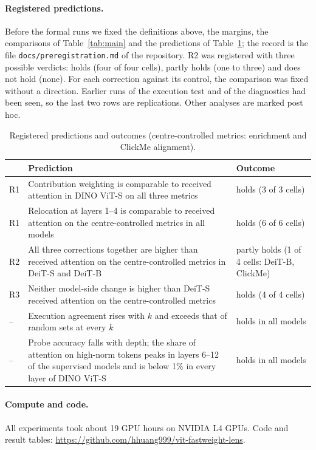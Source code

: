 \paragraph{Registered predictions.} Before the formal runs we fixed the definitions above, the margins, the comparisons of Table~\ref{tab:main} and the predictions of Table~\ref{tab:app-registered}; the record is the file \texttt{docs/preregistration.md} of the repository. R2 was registered with three possible verdicts: holds (four of four cells), partly holds (one to three) and does not hold (none). For each correction against its control, the comparison was fixed without a direction. Earlier runs of the execution test and of the diagnostics had been seen, so the last two rows are replications. Other analyses are marked post hoc.

\begin{table}[!htbp]
\caption{Registered predictions and outcomes (centre-controlled metrics: enrichment and ClickMe alignment).}
\label{tab:app-registered}
\centering\footnotesize
\setlength{\tabcolsep}{4pt}
\begin{tabular}{@{}l>{\raggedright\arraybackslash}p{3.55in}>{\raggedright\arraybackslash}p{1.35in}@{}}
\toprule
 & Prediction & Outcome\\
\midrule
R1 & Contribution weighting is comparable to received attention in DINO ViT-S on all three metrics & holds (3 of 3 cells)\\
R1 & Relocation at layers 1--4 is comparable to received attention on the centre-controlled metrics in all models & holds (6 of 6 cells)\\
R2 & All three corrections together are higher than received attention on the centre-controlled metrics in DeiT-S and DeiT-B & partly holds (1 of 4 cells: DeiT-B, ClickMe)\\
R3 & Neither model-side change is higher than DeiT-S received attention on the centre-controlled metrics & holds (4 of 4 cells)\\
\midrule
-- & Execution agreement rises with $k$ and exceeds that of random sets at every $k$ & holds in all models\\
-- & Probe accuracy falls with depth; the share of attention on high-norm tokens peaks in layers 6--12 of the supervised models and is below 1\% in every layer of DINO ViT-S & holds in all models\\
\bottomrule
\end{tabular}
\end{table}

\paragraph{Compute and code.} All experiments took about 19 GPU hours on NVIDIA L4 GPUs. Code and result tables: \url{https://github.com/hhuang999/vit-fastweight-lens}.

